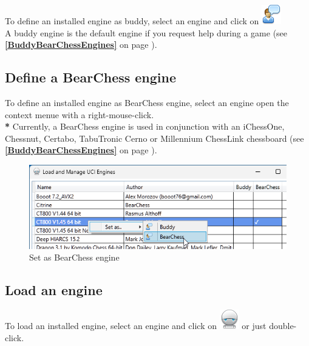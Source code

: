 \documentclass[11pt,a4paper]{article}
\begin{document}
	To define an installed engine as buddy, select an engine and click on \includegraphics[scale=0.5]{user_comment.png}\\
	A buddy engine is the default engine if you request help during a game (see \textbf{\ref{BuddyBearChessEngines}  } on page \pageref{BuddyBearChessEngines}).
	
	
	\subsection{Define a BearChess engine} \label{BearChessEngine}
	
	To define an installed engine as BearChess engine, select an engine open the context menue with a right-mouse-click.\\
	{\color{red}\textbf{*}} Currently, a BearChess engine is used in conjunction with an iChessOne, Chessnut, Certabo, TabuTronic Cerno or Millennium ChessLink chessboard (see  \textbf{\ref{BuddyBearChessEngines}  } on page \pageref{BuddyBearChessEngines}).
	
	\begin{figure}[H]
		\centering
		\includegraphics[scale=0.8]{BearChessEngine1.png}
		\caption{Set as BearChess engine}
		\label{fig:BearChessEngine1}
	\end{figure}
	
	
	\subsection{Load an engine}
	
	To load an installed engine, select an engine and click on \includegraphics[scale=0.5]{robot.png} or just double-click.
	
\end{document}
